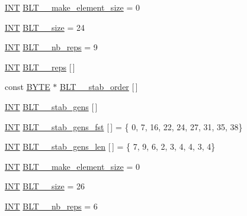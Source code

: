 \begin{DoxyCompactItemize}
\item 
\mbox{\hyperlink{galois_8h_a09fddde158a3a20bd2dcadb609de11dc}{I\+NT}} \mbox{\hyperlink{data___b_l_t_8_c_a308707f34aa6755bcfb36d002845b2f9}{B\+L\+T\+\_\+\_\+make\+\_\+element\+\_\+size}} = 0
\item 
\mbox{\hyperlink{galois_8h_a09fddde158a3a20bd2dcadb609de11dc}{I\+NT}} \mbox{\hyperlink{data___b_l_t_8_c_a6a60e513ddcad9493bb0407c428baa1d}{B\+L\+T\+\_\+\_\+size}} = 24
\item 
\mbox{\hyperlink{galois_8h_a09fddde158a3a20bd2dcadb609de11dc}{I\+NT}} \mbox{\hyperlink{data___b_l_t_8_c_adef9103294f96c097dfb8b1eaf6f7df7}{B\+L\+T\+\_\+\_\+nb\+\_\+reps}} = 9
\item 
\mbox{\hyperlink{galois_8h_a09fddde158a3a20bd2dcadb609de11dc}{I\+NT}} \mbox{\hyperlink{data___b_l_t_8_c_ae958c92fc767a20bc621a63e9229dd5e}{B\+L\+T\+\_\+\_\+reps}} \mbox{[}$\,$\mbox{]}
\item 
const \mbox{\hyperlink{galois_8h_ab6cc7b4aeb6ea31aba2b3fbfc83ff5e6}{B\+Y\+TE}} $\ast$ \mbox{\hyperlink{data___b_l_t_8_c_a77fd146bf1d0312c4602c7fadbd09dda}{B\+L\+T\+\_\+\_\+stab\+\_\+order}} \mbox{[}$\,$\mbox{]}
\item 
\mbox{\hyperlink{galois_8h_a09fddde158a3a20bd2dcadb609de11dc}{I\+NT}} \mbox{\hyperlink{data___b_l_t_8_c_ac2a3922b7e838deba9370803a97f5c81}{B\+L\+T\+\_\+\_\+stab\+\_\+gens}} \mbox{[}$\,$\mbox{]}
\item 
\mbox{\hyperlink{galois_8h_a09fddde158a3a20bd2dcadb609de11dc}{I\+NT}} \mbox{\hyperlink{data___b_l_t_8_c_a54c68a7c0a8fef70dcbe16debad022d7}{B\+L\+T\+\_\+\_\+stab\+\_\+gens\+\_\+fst}} \mbox{[}$\,$\mbox{]} = \{ 0, 7, 16, 22, 24, 27, 31, 35, 38\}
\item 
\mbox{\hyperlink{galois_8h_a09fddde158a3a20bd2dcadb609de11dc}{I\+NT}} \mbox{\hyperlink{data___b_l_t_8_c_a5a3c157bcda5f0b7de8e47f88efef139}{B\+L\+T\+\_\+\_\+stab\+\_\+gens\+\_\+len}} \mbox{[}$\,$\mbox{]} = \{ 7, 9, 6, 2, 3, 4, 4, 3, 4\}
\item 
\mbox{\hyperlink{galois_8h_a09fddde158a3a20bd2dcadb609de11dc}{I\+NT}} \mbox{\hyperlink{data___b_l_t_8_c_af3c74117e94d05d0a1dd1399e6265660}{B\+L\+T\+\_\+\_\+make\+\_\+element\+\_\+size}} = 0
\item 
\mbox{\hyperlink{galois_8h_a09fddde158a3a20bd2dcadb609de11dc}{I\+NT}} \mbox{\hyperlink{data___b_l_t_8_c_a16af21f0f925fd1434540b1ccebc143f}{B\+L\+T\+\_\+\_\+size}} = 26
\item 
\mbox{\hyperlink{galois_8h_a09fddde158a3a20bd2dcadb609de11dc}{I\+NT}} \mbox{\hyperlink{data___b_l_t_8_c_ac890967b94ac99343a30aa25ed743b7d}{B\+L\+T\+\_\+\_\+nb\+\_\+reps}} = 6

\end{DoxyCompactItemize}
